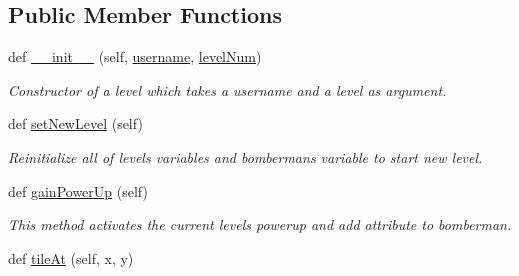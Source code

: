 \subsection*{Public Member Functions}
\begin{DoxyCompactItemize}
\item 
\hypertarget{classsrc_1_1level_1_1_level_ab6e52c74e02be818576be2ffd9040fe0}{}def \hyperlink{classsrc_1_1level_1_1_level_ab6e52c74e02be818576be2ffd9040fe0}{\+\_\+\+\_\+init\+\_\+\+\_\+} (self, \hyperlink{classsrc_1_1level_1_1_level_a7ec8be181d4558bc3f7b8c106a6aeb5a}{username}, \hyperlink{classsrc_1_1level_1_1_level_a8b26c1249a2d161c058595e789948bf9}{level\+Num})\label{classsrc_1_1level_1_1_level_ab6e52c74e02be818576be2ffd9040fe0}

\begin{DoxyCompactList}\small\item\em Constructor of a level which takes a username and a level as argument. \end{DoxyCompactList}\item 
\hypertarget{classsrc_1_1level_1_1_level_a0df76bcc440bbab23e4ce754223177c5}{}def \hyperlink{classsrc_1_1level_1_1_level_a0df76bcc440bbab23e4ce754223177c5}{set\+New\+Level} (self)\label{classsrc_1_1level_1_1_level_a0df76bcc440bbab23e4ce754223177c5}

\begin{DoxyCompactList}\small\item\em Reinitialize all of level\textquotesingle{}s variables and bomberman\textquotesingle{}s variable to start new level. \end{DoxyCompactList}\item 
\hypertarget{classsrc_1_1level_1_1_level_a9af98db5112ae2fbd4a9f44ae0bcbe83}{}def \hyperlink{classsrc_1_1level_1_1_level_a9af98db5112ae2fbd4a9f44ae0bcbe83}{gain\+Power\+Up} (self)\label{classsrc_1_1level_1_1_level_a9af98db5112ae2fbd4a9f44ae0bcbe83}

\begin{DoxyCompactList}\small\item\em This method activates the current level\textquotesingle{}s powerup and add attribute to bomberman. \end{DoxyCompactList}\item 
\hypertarget{classsrc_1_1level_1_1_level_a9f1a64a223be266425f6100e4728df3a}{}def \hyperlink{classsrc_1_1level_1_1_level_a9f1a64a223be266425f6100e4728df3a}{tile\+At} (self, x, y)\label{classsrc_1_1level_1_1_level_a9f1a64a223be266425f6100e4728df3a}


\end{DoxyCompactItemize}
